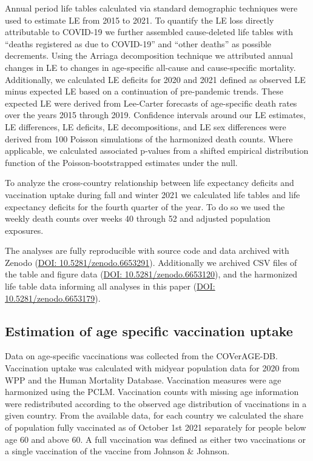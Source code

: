 \documentclass[12pt]{article}
\begin{document}
Annual period life tables calculated via standard demographic techniques\cite{Chiang1979} were used to estimate LE from 2015 to 2021. To quantify the LE loss directly attributable to COVID-19 we further assembled cause-deleted life tables with ``deaths registered as due to COVID-19'' and ``other deaths'' as possible decrements.\cite{Preston2001} Using the Arriaga decomposition technique\cite{Arriaga1984} we attributed annual changes in LE to changes in age-specific all-cause and cause-specific mortality. Additionally, we calculated LE deficits for 2020 and 2021 defined as observed LE minus expected LE based on a continuation of pre-pandemic trends. These expected LE were derived from Lee-Carter forecasts\cite{Lee1992} of age-specific death rates over the years 2015 through 2019.
Confidence intervals around our LE estimates, LE differences, LE deficits, LE decompositions, and LE sex differences were derived from 100 Poisson simulations of the harmonized death counts. Where applicable, we calculated associated p-values from a shifted empirical distribution function of the Poisson-bootstrapped estimates under the null.

To analyze the cross-country relationship between life expectancy deficits and vaccination uptake during fall and winter 2021 we calculated life tables and life expectancy deficits for the fourth quarter of the year. To do so we used the weekly death counts over weeks 40 through 52 and adjusted population exposures.

The analyses are fully reproducible with source code and data archived with Zenodo (\href{https://zenodo.org/record/6653291}{DOI:  10.5281/zenodo.6653291}). Additionally we archived CSV files of the table and figure data (\href{https://zenodo.org/record/6653120}{DOI: 10.5281/zenodo.6653120}), and the harmonized life table data informing all analyses in this paper (\href{https://zenodo.org/record/6653179}{DOI: 10.5281/zenodo.6653179}).

\subsection*{Estimation of age specific vaccination uptake}

Data on age-specific vaccinations was collected from the COVerAGE-DB.\cite{Riffe2021} Vaccination uptake was calculated with midyear population data for 2020 from WPP\cite{UnitedNations2021} and the Human Mortality Database. Vaccination measures were age harmonized using the PCLM. Vaccination counts with missing age information were redistributed according to the observed age distribution of vaccinations in a given country. From the available data, for each country we calculated the share of population fully vaccinated as of October 1st 2021 separately for people below age 60 and above 60. A full vaccination was defined as either two vaccinations or a single vaccination of the vaccine from Johnson \& Johnson.
\end{document}

